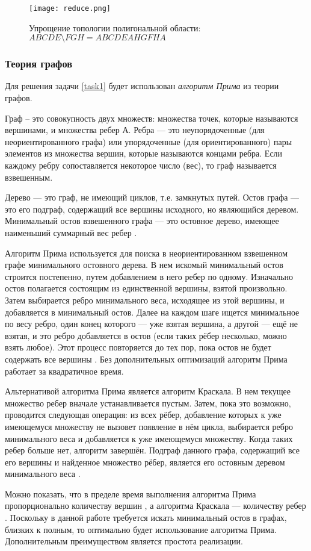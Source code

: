 \begin{figure}[ht]
    \centering
    \texttt{[image: reduce.png]}
    \caption{Упрощение топологии полигональной области: $ABCDE \setminus FGH = ABCDEAHGFHA$}
    \label{fig:polysimp}
\end{figure}

\subsubsection{Теория графов}
\label{}

Для решения задачи \ref{task1} будет использован \textit{алгоритм Прима} из теории графов.

Граф – это совокупность двух множеств: множества точек, которые называются вершинами, и множества ребер А. Ребра --- это неупорядоченные (для неориентированного графа) или упорядоченные (для ориентированного) пары элементов из множества вершин, которые называются концами ребра. Если каждому ребру сопоставляется некоторое число (вес), то граф называется взвешенным. 

Дерево --- это граф, не имеющий циклов, т.е. замкнутых путей. Остов графа --- это его подграф, содержащий все вершины исходного, но являющийся деревом. Минимальный остов взвешенного графа --- это остовное дерево, имеющее наименьший суммарный вес ребер \cite{__2010}.

Алгоритм Прима используется для поиска в неориентированном взвешенном графе минимального остовного дерева. В нем искомый минимальный остов строится постепенно, путем добавлением в него ребер по одному. Изначально остов полагается состоящим из единственной вершины, взятой произвольно. Затем выбирается ребро минимального веса, исходящее из этой вершины, и добавляется в минимальный остов. Далее на каждом шаге ищется минимальное по весу ребро, один конец которого — уже взятая вершина, а другой — ещё не взятая, и это ребро добавляется в остов (если таких рёбер несколько, можно взять любое). Этот процесс повторяется до тех пор, пока остов не будет содержать все вершины \cite{prim_shortest_1957}. Без дополнительных оптимизаций алгоритм Прима работает за квадратичное время.

Альтернативой алгоритма Прима является алгоритм Краскала. В нем текущее множество ребер вначале устанавливается пустым. Затем, пока это возможно, проводится следующая операция: из всех рёбер, добавление которых к уже имеющемуся множеству не вызовет появление в нём цикла, выбирается ребро минимального веса и добавляется к уже имеющемуся множеству. Когда таких ребер больше нет, алгоритм завершён. Подграф данного графа, содержащий все его вершины и найденное множество рёбер, является его остовным деревом минимального веса \cite{kruskal_shortest_1956}.

Можно показать, что в пределе время выполнения алгоритма Прима пропорционально количеству вершин \cite{prim_shortest_1957}, а алгоритма Краскала --- количеству ребер \cite{kruskal_shortest_1956}. Поскольку в данной работе требуется искать минимальный остов в графах, близких к полным, то оптимально будет использование алгоритма Прима. Дополнительным преимуществом является простота реализации.